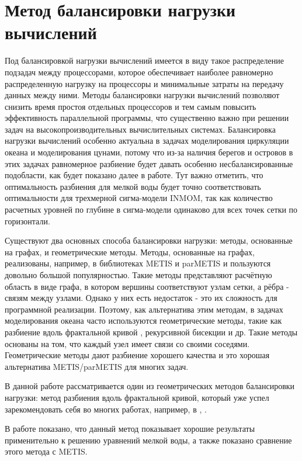 \section{Метод балансировки нагрузки вычислений}\label{sec:ch2/sec3}

Под балансировкой нагрузки вычислений имеется в виду такое распределение подзадач между процессорами, 
которое обеспечивает наиболее равномерно распределенную нагрузку на процессоры и минимальные затраты на передачу данных между ними.
Методы балансировки нагрузки вычислений позволяют снизить время простоя отдельных процессоров
и тем самым повысить эффективность параллельной программы, что существенно важно при решении задач 
на высокопроизводительных вычислительных системах.
Балансировка нагрузки вычислений особенно актуальна в задачах моделирования циркуляции океана и моделирования цунами,
потому что из-за наличия берегов и островов в этих задачах равномерное разбиение будет давать особенно несбалансированные подобласти, как будет показано далее в работе.
Тут важно отметить, что оптимальность разбиения для мелкой воды будет точно соответствовать оптимальности для трехмерной сигма-модели INMOM, 
так как количество расчетных уровней по глубине в сигма-модели одинаково для всех точек сетки по горизонтали. 

Существуют два основных способа балансировки нагрузки: методы, основанные на графах, и геометрические методы. 
Методы, основанные на графах, реализованы, например, в библиотеках METIS и parMETIS \cite{METIS} и пользуются довольно большой популярностью. 
Такие методы представляют расчётную область в виде графа, в котором вершины соответствуют узлам сетки, а рёбра - связям между узлами.
Однако у них есть недостаток - это их сложность для программной реализации. 
Поэтому, как альтернатива этим методам, в задачах моделирования океана часто используются 
геометрические методы, такие как разбиение вдоль фрактальной кривой \cite{Dennis2007}, рекурсивной бисекции \cite{Rantakokko1998} и др. 
Такие методы основаны на том, что каждый узел имеет связи со своими соседями.
Геометрические методы дают разбиение хорошего качества и это хорошая альтернатива METIS/parMETIS для многих задач. 
    
В данной работе рассматривается один из геометрических методов балансировки нагрузки: метод разбиения вдоль фрактальной кривой, который
уже успел зарекомендовать себя во многих работах, например, в \cite{Dennis2007}, \cite{Hui2017}. 

В работе показано, что данный метод показывает хорошие результаты применительно к решению уравнений мелкой воды, а также показано сравнение этого метода с METIS.

